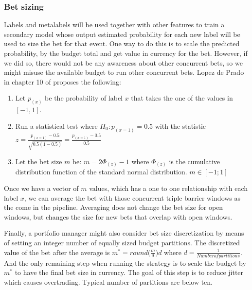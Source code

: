 \subsubsection{Bet sizing}
\label{sec:methods_pipeline_bet_sizing}

Labels and metalabels will be used together with other features to train a secondary
model whose output estimated probability for each new label will be used to size
the bet for that event. One way to do this is to scale the predicted probability,
by the budget total and get value in currency for the bet. However, if we did so,
there would not be any awareness about other concurrent bets, so we might misuse
the available budget to run other concurrent bets. Lopez de Prado in chapter 10
of \cite{lopez_de_prado} proposes the following:

\begin{enumerate}
  \item Let $p_{(x)}$ be the probability of label $x$ that takes the one of the
        values in $[-1, 1]$.
  \item Run a statistical test where $H_{0}: p_{(x=1)} = 0.5$ with the statistic
        $z = \frac{p_{(x=1)} - 0.5}{\sqrt{0.5(1-0.5)}} = \frac{p_{(x=1)} - 0.5}{0.5}$
  \item Let the bet size $m$ be: $m = 2 \Phi_{(z)} - 1$ where $\Phi_{(z)}$ is
        the cumulative distribution function of the standard normal
        distribution. $m \in [-1; 1]$
\end{enumerate}

Once we have a vector of $m$ values, which has a one to one relationship with
each label $x$, we can average the bet with those concurrent triple barrier
windows as the come in the pipeline. Averaging does not change the bet size
for open windows, but changes the size for new bets that overlap with open
windows.

Finally, a portfolio manager might also consider bet size discretization by
means of setting an integer number of equally sized budget partitions. The
discretized value of the bet after the average is $m^* = round\Bigg( \frac{m}{d} \Bigg) d$
where $d = \frac{1}{Number of partitions}$. And the only remaining step when
running the strategy is to scale the budget by $m^*$ to have the final bet size
in currency. The goal of this step is to reduce jitter which causes overtrading.
Typical number of partitions are below ten.
